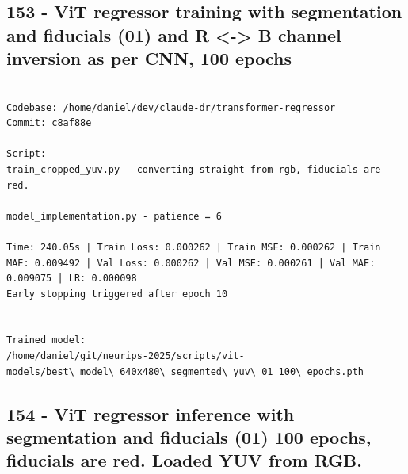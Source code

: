 \subsection{153 - ViT regressor training with segmentation and fiducials (01) and R <-> B channel inversion as per CNN, 100 epochs}
\label{app_res:153}

\begin{verbatim}

Codebase: /home/daniel/dev/claude-dr/transformer-regressor 
Commit: c8af88e

Script:
train_cropped_yuv.py - converting straight from rgb, fiducials are red.

model_implementation.py - patience = 6

Time: 240.05s | Train Loss: 0.000262 | Train MSE: 0.000262 | Train MAE: 0.009492 | Val Loss: 0.000262 | Val MSE: 0.000261 | Val MAE: 0.009075 | LR: 0.000098
Early stopping triggered after epoch 10


Trained model:
/home/daniel/git/neurips-2025/scripts/vit-models/best\_model\_640x480\_segmented\_yuv\_01_100\_epochs.pth
\end{verbatim}

\subsection{154 - ViT regressor inference with segmentation and fiducials (01) 100 epochs, fiducials are red. Loaded YUV from RGB.}
\label{app_res:154}

